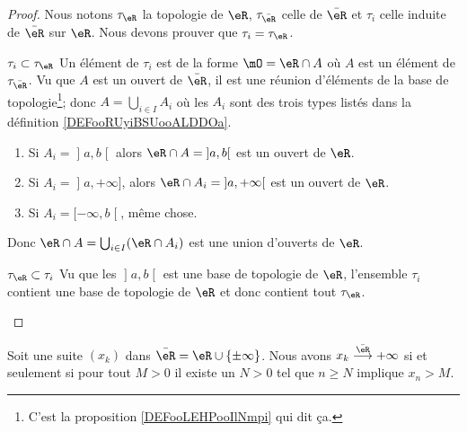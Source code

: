 \begin{proof}
    Nous notons \( \tau_{\eR}\) la topologie de \( \eR\), \( \tau_{\bar \eR}\) celle de \( \bar \eR\) et \( \tau_i\) celle induite de \( \bar \eR\) sur \( \eR\). Nous devons prouver que \( \tau_i=\tau_{\eR}\).
    
    \begin{subproof}
        \item[\( \tau_i\subset\tau_{\eR}\)]
            Un élément de \( \tau_i\) est de la forme \( \mO=\eR\cap A\) où \( A\) est un élément de \( \tau_{\bar \eR}\). Vu que \( A\) est un ouvert de \( \bar \eR\), il est une réunion d'éléments de la base de topologie\footnote{C'est la proposition \ref{DEFooLEHPooIlNmpi} qui dit ça.}; donc \( A=\bigcup_{i\in I}A_i\) où les \( A_i\) sont des trois types listés dans la définition \ref{DEFooRUyiBSUooALDDOa}.
            \begin{enumerate}
                \item
                Si \( A_i=\mathopen] a , b \mathclose[\) alors \( \eR\cap A=\mathopen] a , b \mathclose[\) est un ouvert de \( \eR\).
            \item Si \( A_i=\mathopen] a , +\infty \mathclose]\), alors \( \eR\cap A_i=\mathopen] a , +\infty \mathclose[\) est un ouvert de \( \eR\).
                \item Si \( A_i=\mathopen[ -\infty , b \mathclose[\), même chose.
            \end{enumerate}
            Donc \( \eR\cap A=\bigcup_{i\in I}(\eR\cap A_i)\) est une union d'ouverts de \( \eR\).
        \item[\( \tau_{\eR}\subset\tau_i\)]
        Vu que les \( \mathopen] a , b \mathclose[\) est une base de topologie de \( \eR\), l'ensemble \( \tau_i\) contient une base de topologie de \( \eR\) et donc contient tout \( \tau_{\eR}\).
    \end{subproof}
\end{proof}

\begin{proposition}
    Soit une suite \( (x_k)\) dans \( \bar \eR=\eR\cup\{ \pm\infty \}\). Nous avons \( x_k\stackrel{\bar \eR}{\longrightarrow}+\infty\) si et seulement si pour tout \( M>0\) il existe un \( N>0\) tel que \( n\geq N\) implique \( x_n>M\).
\end{proposition}

